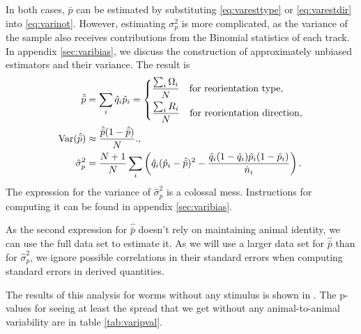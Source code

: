 \documentclass[12pt]{article}
\begin{document}
In both cases, $\bar{p}$ can be estimated by substituting \eqref{eq:varesttype} or \eqref{eq:varestdir} into \eqref{eq:varinot}. However, estimating $\sigma_p^2$ is more complicated, as the variance of the sample also receives contributions from the Binomial statistics of each track. In appendix \ref{sec:varibias}, we discuss the construction of approximately unbiased estimators and their variance. The result is
%
\begin{equation}\label{eq:variests}
  \begin{aligned}
    \hat{\bar{p}} &= \sum_i \hat{q}_i \hat{p}_i
       =\left\{\begin{aligned}
      & \frac{\sum_i \Omega_i}{N} \quad \text{for reorientation type,}\\
      & \frac{\sum_i R_i}{N}  \quad \text{for reorientation direction,}
       \end{aligned}\right. \\
    \operatorname{Var}(\hat{\bar{p}}) &\approx \frac{\hat{\bar{p}}(1-\hat{\bar{p}})}{N}.,\\
    \hat{\sigma}_p^2 &= \frac{N+1}{N} \sum_i\left (  \hat{q}_i(\hat{p}_i-\hat{\bar{p}})^2 - \frac{\hat{q}_i(1-\hat{q}_i)\hat{p}_i(1-\hat{p}_i)}{\hat{n}_i} \right ).
  \end{aligned}
\end{equation}
%
The expression for the variance of $\hat{\sigma}_p^2$ is a colossal mess. Instructions for computing it can be found in appendix \ref{sec:varibias}.

As the second expression for $\hat{\bar{p}}$ doesn't rely on maintaining animal identity, we can use the full data set to estimate it. As we will use a larger data set for $\hat{\bar{p}}$ than for $\hat{\sigma}_p^2$, we ignore possible correlations in their standard errors when computing standard errors in derived quantities.

The results of this analysis for worms without any stimulus is shown in . The p-values for seeing at least the spread that we get without any animal-to-animal variability are in table \ref{tab:varipval}.
\end{document}
